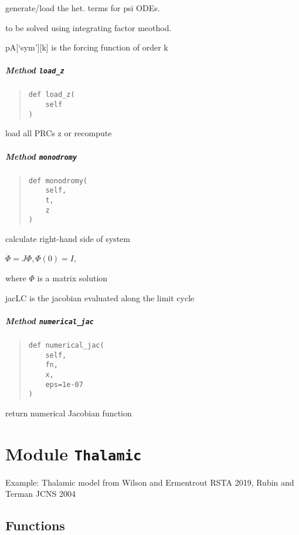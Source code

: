 \documentclass[english,a4paper,oneside]{article}
\let\oldsubparagraph\subparagraph
\renewcommand{\subparagraph}[1]{\oldsubparagraph{#1}\mbox{}}
\begin{document}
generate/load the het. terms for psi ODEs.

to be solved using integrating factor meothod.

pA{[}`sym'{]}{[}k{]} is the forcing function of order k

\subparagraph{\texorpdfstring{Method
\texttt{load\_z}}{Method load\_z}}\label{StrongCoupling.StrongCoupling.load_z}

\begin{quote}
\begin{verbatim}
def load_z(
    self
)
\end{verbatim}
\end{quote}

load all PRCs z or recompute

\subparagraph{\texorpdfstring{Method
\texttt{monodromy}}{Method monodromy}}\label{StrongCoupling.StrongCoupling.monodromy}

\begin{quote}
\begin{verbatim}
def monodromy(
    self,
    t,
    z
)
\end{verbatim}
\end{quote}

calculate right-hand side of system

\(\dot \Phi = J\Phi, \Phi(0)=I\),

where \(\Phi\) is a matrix solution

jacLC is the jacobian evaluated along the limit cycle

\subparagraph{\texorpdfstring{Method
\texttt{numerical\_jac}}{Method numerical\_jac}}\label{StrongCoupling.StrongCoupling.numerical_jac}

\begin{quote}
\begin{verbatim}
def numerical_jac(
    self,
    fn,
    x,
    eps=1e-07
)
\end{verbatim}
\end{quote}

return numerical Jacobian function

\section{\texorpdfstring{Module
\texttt{Thalamic}}{Module Thalamic}}\label{Thalamic}

Example: Thalamic model from Wilson and Ermentrout RSTA 2019, Rubin and
Terman JCNS 2004

\subsection{Functions}\label{functions-1}
\end{document}

